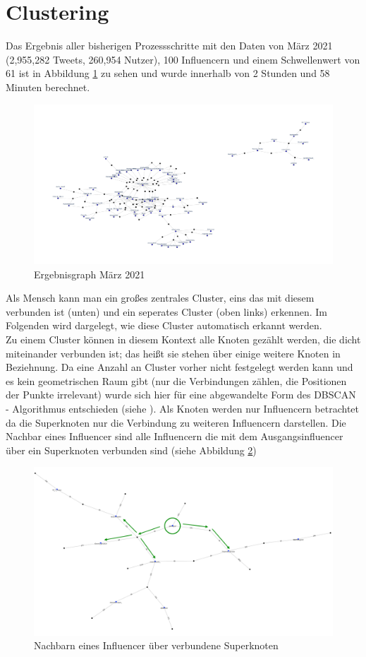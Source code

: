 \section{Clustering}
\label{sec:clutering}
Das Ergebnis aller bisherigen Prozessschritte mit den Daten von März 2021 (2,955,282 Tweets, 260,954 Nutzer), 100 Influencern und einem Schwellenwert von 61 ist in Abbildung \ref{fig:noclusters} zu sehen und wurde innerhalb von 2 Stunden und 58 Minuten berechnet. \newline
\begin{figure}[h!]
	\centering
	\includegraphics[width=\linewidth]{images/NoClusters}
	\caption{Ergebnisgraph März 2021}
	\label{fig:noclusters}
\end{figure}
Als Mensch kann man ein  großes zentrales \gls{Cluster}, eins das mit diesem verbunden ist (unten) und ein seperates \gls{Cluster} (oben links) erkennen. 
Im Folgenden wird dargelegt, wie diese \gls{Cluster} automatisch erkannt werden.\\
Zu einem \gls{Cluster} können in diesem Kontext alle Knoten gezählt werden, die dicht miteinander verbunden ist; das heißt sie stehen über einige weitere Knoten in Beziehnung.
Da eine Anzahl an \gls{Cluster} vorher nicht festgelegt werden kann und es kein geometrischen Raum gibt (nur die Verbindungen zählen, die Positionen der Punkte irrelevant) wurde sich hier für eine abgewandelte Form des DBSCAN - Algorithmus entschieden (siehe \cite{dbscan}).
Als Knoten werden nur Influencern betrachtet da die Superknoten nur die Verbindung zu weiteren Influencern darstellen. 
Die Nachbar eines Influencer sind alle Influencern die mit dem Ausgangsinfluencer über ein Superknoten verbunden sind (siehe Abbildung \ref{fig:dbscan-neighbours})
\begin{figure}
	\centering
	\includegraphics[width=0.7\linewidth]{images/DBSCAN-neighbours}
	\caption{Nachbarn eines Influencer über verbundene Superknoten}
	\label{fig:dbscan-neighbours}
\end{figure}
